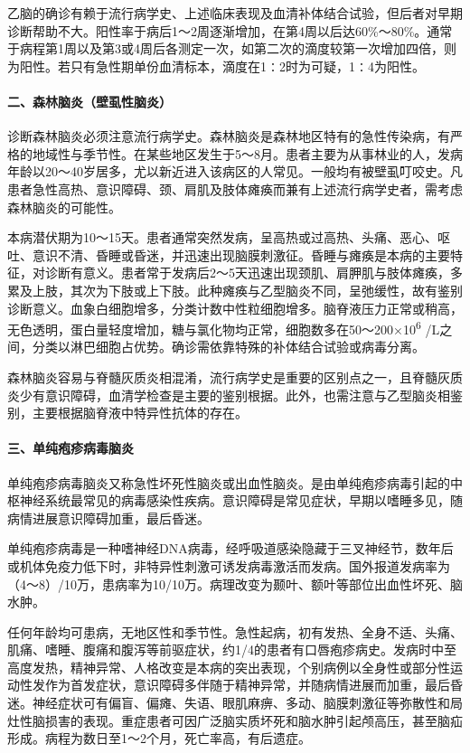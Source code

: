 乙脑的确诊有赖于流行病学史、上述临床表现及血清补体结合试验，但后者对早期诊断帮助不大。阳性率于病后1～2周逐渐增加，在第4周以后达60\%～80\%。通常于病程第1周以及第3或4周后各测定一次，如第二次的滴度较第一次增加四倍，则为阳性。若只有急性期单份血清标本，滴度在1∶2时为可疑，1∶4为阳性。

\paragraph{二、森林脑炎（壁虱性脑炎）}

诊断森林脑炎必须注意流行病学史。森林脑炎是森林地区特有的急性传染病，有严格的地域性与季节性。在某些地区发生于5～8月。患者主要为从事林业的人，发病年龄以20～40岁居多，尤以新近进入该病区的人常见。一般均有被壁虱叮咬史。凡患者急性高热、意识障碍、颈、肩肌及肢体瘫痪而兼有上述流行病学史者，需考虑森林脑炎的可能性。

本病潜伏期为10～15天。患者通常突然发病，呈高热或过高热、头痛、恶心、呕吐、意识不清、昏睡或昏迷，并迅速出现脑膜刺激征。昏睡与瘫痪是本病的主要特征，对诊断有意义。患者常于发病后2～5天迅速出现颈肌、肩胛肌与肢体瘫痪，多累及上肢，其次为下肢或上下肢。此种瘫痪与乙型脑炎不同，呈弛缓性，故有鉴别诊断意义。血象白细胞增多，分类计数中性粒细胞增多。脑脊液压力正常或稍高，无色透明，蛋白量轻度增加，糖与氯化物均正常，细胞数多在50～200×10\textsuperscript{6}
/L之间，分类以淋巴细胞占优势。确诊需依靠特殊的补体结合试验或病毒分离。

森林脑炎容易与脊髓灰质炎相混淆，流行病学史是重要的区别点之一，且脊髓灰质炎少有意识障碍，血清学检查是主要的鉴别根据。此外，也需注意与乙型脑炎相鉴别，主要根据脑脊液中特异性抗体的存在。

\paragraph{三、单纯疱疹病毒脑炎}

单纯疱疹病毒脑炎又称急性坏死性脑炎或出血性脑炎。是由单纯疱疹病毒引起的中枢神经系统最常见的病毒感染性疾病。意识障碍是常见症状，早期以嗜睡多见，随病情进展意识障碍加重，最后昏迷。

单纯疱疹病毒是一种嗜神经DNA病毒，经呼吸道感染隐藏于三叉神经节，数年后或机体免疫力低下时，非特异性刺激可诱发病毒激活而发病。国外报道发病率为（4～8）/10万，患病率为10/10万。病理改变为颞叶、额叶等部位出血性坏死、脑水肿。

任何年龄均可患病，无地区性和季节性。急性起病，初有发热、全身不适、头痛、肌痛、嗜睡、腹痛和腹泻等前驱症状，约1/4的患者有口唇疱疹病史。发病时中至高度发热，精神异常、人格改变是本病的突出表现，个别病例以全身性或部分性运动性发作为首发症状，意识障碍多伴随于精神异常，并随病情进展而加重，最后昏迷。神经症状可有偏盲、偏瘫、失语、眼肌麻痹、多动、脑膜刺激征等弥散性和局灶性脑损害的表现。重症患者可因广泛脑实质坏死和脑水肿引起颅高压，甚至脑疝形成。病程为数日至1～2个月，死亡率高，有后遗症。

